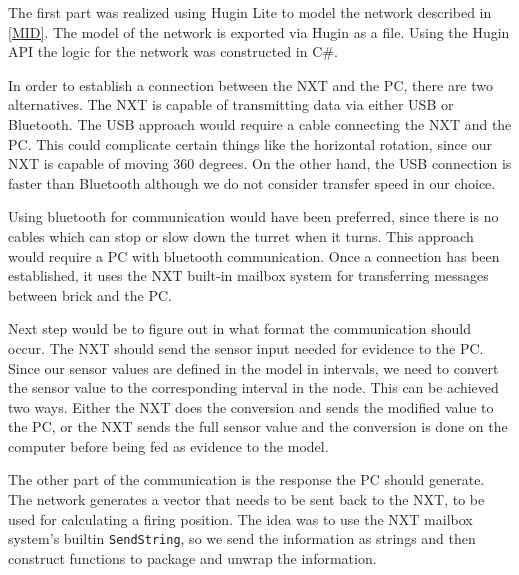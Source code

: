 The first part was realized using Hugin Lite to model the network described
in \autoref{MID}. The model of the network is exported via Hugin as a file.
Using the Hugin API the logic for the network was constructed in C\#.\nl

In order to establish a connection between the NXT and the PC, there are two
alternatives. The NXT is capable of transmitting data via either USB or
Bluetooth.
The USB approach would require a cable connecting the NXT and the PC. This could
complicate certain things like the horizontal rotation, since our NXT is capable
of moving 360 degrees. On the other hand, the USB connection is faster than
Bluetooth although we do not consider transfer speed in our choice.\nl

Using bluetooth for communication would have been preferred, since there is
no cables which can stop or slow down the turret when it turns. 
This approach would require a PC with bluetooth communication. Once a connection has
been established, it uses the NXT built-in mailbox system for transferring
messages between brick and the PC.\nl

Next step would be to figure out in what format the communication should occur.
The NXT should send the sensor input needed for evidence to the PC. Since our
sensor values are defined in the model in intervals, we need to convert the
sensor value to the corresponding interval in the node. This can be achieved two ways. Either
the NXT does the conversion and sends the modified value to the PC, or the NXT
sends the full sensor value and the conversion is done on the computer before
being fed as evidence to the model.\nl

The other part of the communication is the response the PC should generate. The
network generates a vector that needs to be sent back to the NXT, to be used for
calculating a firing position. The idea was to use the NXT mailbox system's
builtin \texttt{SendString}, so we send the information as strings and then
construct functions to package and unwrap the information.


